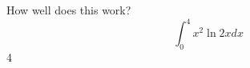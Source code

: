 \documentclass{article}
\begin{document}
How well does this work?
$$\int_0^4 x^2 \ln{2x}dx$$
4
\end{document}
